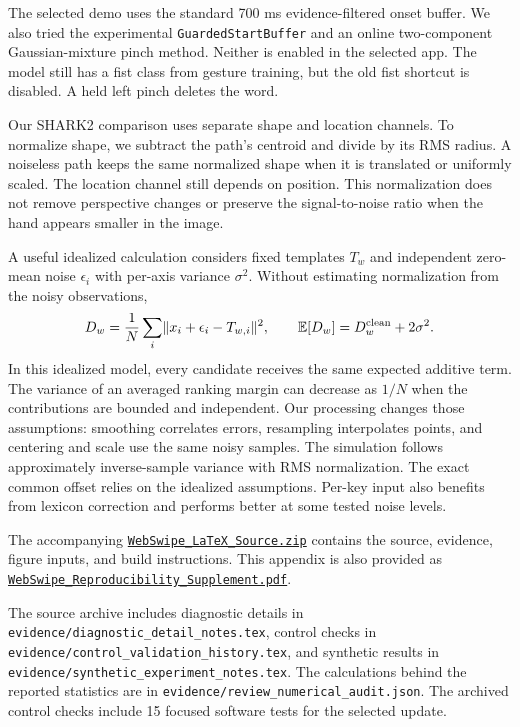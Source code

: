 The selected demo uses the standard 700 ms evidence-filtered onset buffer. We also tried the experimental \texttt{GuardedStartBuffer} and an online two-component Gaussian-mixture pinch method. Neither is enabled in the selected app. The model still has a fist class from gesture training, but the old fist shortcut is disabled. A held left pinch deletes the word.


Our SHARK2 comparison uses separate shape and location channels. To normalize shape, we subtract the path's centroid and divide by its RMS radius. A noiseless path keeps the same normalized shape when it is translated or uniformly scaled. The location channel still depends on position. This normalization does not remove perspective changes or preserve the signal-to-noise ratio when the hand appears smaller in the image.

A useful idealized calculation considers fixed templates $T_w$ and independent zero-mean noise $\epsilon_i$ with per-axis variance $\sigma^2$. Without estimating normalization from the noisy observations,
\begin{equation}
D_w=\frac{1}{N}\sum_i\lVert x_i+\epsilon_i-T_{w,i}\rVert^2,
\qquad \mathbb{E}[D_w]=D_w^{\rm clean}+2\sigma^2.
\end{equation}
In this idealized model, every candidate receives the same expected additive term. The variance of an averaged ranking margin can decrease as $1/N$ when the contributions are bounded and independent. Our processing changes those assumptions: smoothing correlates errors, resampling interpolates points, and centering and scale use the same noisy samples. The simulation follows approximately inverse-sample variance with RMS normalization. The exact common offset relies on the idealized assumptions. Per-key input also benefits from lexicon correction and performs better at some tested noise levels.


The accompanying \href{WebSwipe_LaTeX_Source.zip}{\nolinkurl{WebSwipe_LaTeX_Source.zip}} contains the source, evidence, figure inputs, and build instructions. This appendix is also provided as \href{WebSwipe_Reproducibility_Supplement.pdf}{\nolinkurl{WebSwipe_Reproducibility_Supplement.pdf}}.

The source archive includes diagnostic details in \nolinkurl{evidence/diagnostic_detail_notes.tex}, control checks in \nolinkurl{evidence/control_validation_history.tex}, and synthetic results in \nolinkurl{evidence/synthetic_experiment_notes.tex}. The calculations behind the reported statistics are in \nolinkurl{evidence/review_numerical_audit.json}. The archived control checks include 15 focused software tests for the selected update.
